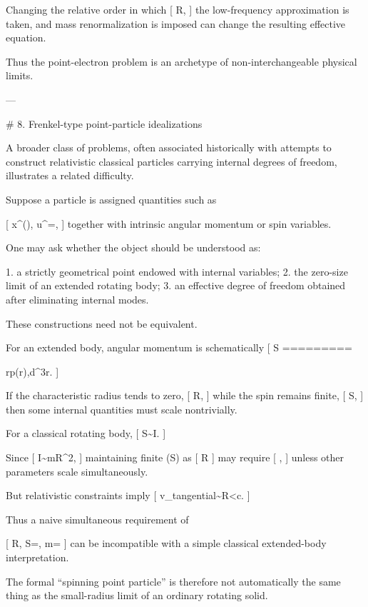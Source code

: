 Changing the relative order in which
[
R,
]
the low-frequency approximation is taken, and mass renormalization is imposed can change the resulting effective equation.

Thus the point-electron problem is an archetype of non-interchangeable physical limits.

---

# 8. Frenkel-type point-particle idealizations

A broader class of problems, often associated historically with attempts to construct relativistic classical particles carrying internal degrees of freedom, illustrates a related difficulty.

Suppose a particle is assigned quantities such as

[
x^\mu(\tau),
\qquad
u^\mu=,
]
together with intrinsic angular momentum or spin variables.

One may ask whether the object should be understood as:

1. a strictly geometrical point endowed with internal variables;
2. the zero-size limit of an extended rotating body;
3. an effective degree of freedom obtained after eliminating internal modes.

These constructions need not be equivalent.

For an extended body, angular momentum is schematically
[
\mathbf S
=========

\int
\mathbf r\times\mathbf p(\mathbf r),d^3r.
]

If the characteristic radius tends to zero,
[
R,
]
while the spin remains finite,
[
S,
]
then some internal quantities must scale nontrivially.

For a classical rotating body,
[
S\sim I\omega.
]

Since
[
I\sim mR^2,
]
maintaining finite (S) as
[
R
]
may require
[
\omega\rightarrow\infty,
]
unless other parameters scale simultaneously.

But relativistic constraints imply
[
v_{\rm tangential}\sim R\omega<c.
]

Thus a naive simultaneous requirement of

[
R,
\qquad
S=,
\qquad
m=
]
can be incompatible with a simple classical extended-body interpretation.

The formal ``spinning point particle'' is therefore not automatically the same thing as the small-radius limit of an ordinary rotating solid.

